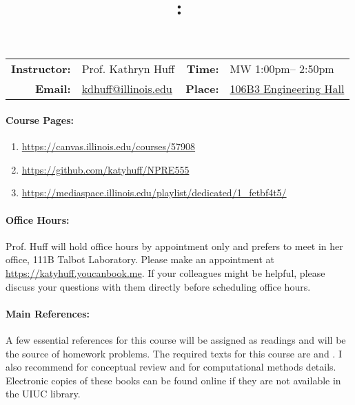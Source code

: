 \documentclass[11pt, a4paper]{article}
\title{\CourseNumber: \CourseTitle\\}
\author{\CourseUniversity}
\date{\CourseSemester \CourseYear}
\makeatletter
\newcommand{\CourseNumber}{NPRE555}
\newcommand{\CourseDays}{MW\xspace}%
\newcommand{\CourseStart}{1:00pm\xspace}%
\newcommand{\CourseEnd}{2:50pm\xspace}%
\newcommand{\CourseInstructor}{Prof. Kathryn Huff}
\newcommand{\CourseInstructorEmail}{kdhuff@illinois.edu}
\newcommand{\CourseRoom}{\href{https://maps.app.goo.gl/mv1KTevxS3pmbSim6}{106B3 Engineering Hall}\xspace}%
\newcommand{\CourseBuilding}{\xspace}%
\newcommand{\HuffOffice}{111B Talbot Laboratory\xspace}
\newcommand{\TeachingAssistant}{TA Name\xspace}%
\newcommand{\TAOfficeHourDays}{Wednesdays\xspace}%
\newcommand{\TAOfficeHourStart}{1:00pm\xspace}%
\newcommand{\TAOfficeHourEnd}{3:00pm\xspace}%
\newcommand{\TAOfficeHourPlace}{123 Talbot Laboratory\xspace}
\makeatother
\begin{document}
\maketitle
\renewcommand{\arraystretch}{2}
\begin{center}
\begin{table}[h]
\begin{tabularx}{\textwidth}{rXrX}
\hline
\textbf{Instructor:} & \CourseInstructor & \textbf{Time:} & \CourseDays \CourseStart -- \CourseEnd \\
\textbf{Email:} &  \href{mailto:\CourseInstructorEmail}{\CourseInstructorEmail} & \textbf{Place:} & \CourseRoom \CourseBuilding\\
\hline
\end{tabularx}

\end{table}
\end{center}

\paragraph{Course Pages:}
\begin{enumerate}
        \item \url{https://canvas.illinois.edu/courses/57908}
        \item \url{https://github.com/katyhuff/\CourseNumber}
        \item 
                \url{https://mediaspace.illinois.edu/playlist/dedicated/1_fetbf4t5/}
\end{enumerate}


\paragraph{Office Hours:} Prof. Huff will hold office hours by appointment 
only and prefers to meet in her office, \HuffOffice. Please make an appointment at 
\url{https://katyhuff.youcanbook.me}. If your colleagues might be helpful, please 
discuss your questions with them directly before scheduling office hours.

\paragraph{Main References:}
A few essential references for this course will be assigned as readings and 
will be the source of homework problems. The required texts for this course are 
\cite{stacey_nuclear_2007} and \cite{bell_nuclear_1970}. I also recommend 
\cite{duderstadt_transport_1979} for conceptual review and 
\cite{lewis_computational_1993} for computational methods details.
Electronic copies of these books can be found online if they are not available
in the UIUC library.
\end{document}
